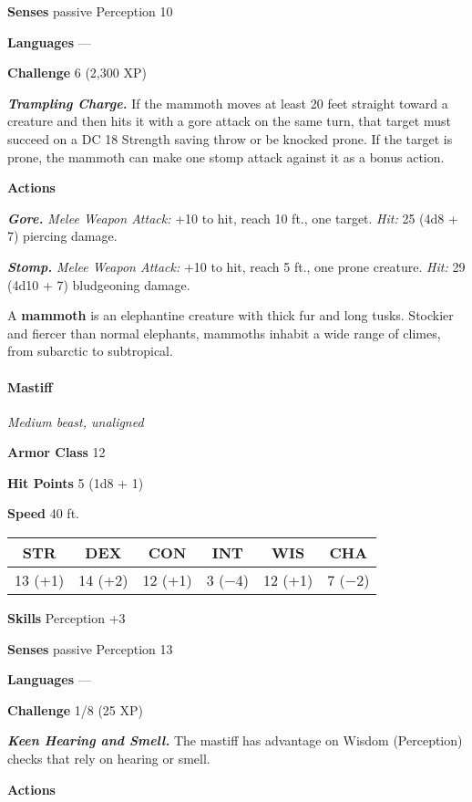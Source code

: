 \documentclass[
]{article}
\begin{document}
\textbf{Senses} passive Perception 10

\textbf{Languages} ---

\textbf{Challenge} 6 (2,300 XP)

\emph{\textbf{Trampling Charge.}} If the mammoth moves at least 20 feet
straight toward a creature and then hits it with a gore attack on the
same turn, that target must succeed on a DC 18 Strength saving throw or
be knocked prone. If the target is prone, the mammoth can make one stomp
attack against it as a bonus action.

\textbf{Actions}

\emph{\textbf{Gore.}} \emph{Melee Weapon Attack:} +10 to hit, reach 10
ft., one target. \emph{Hit:} 25 (4d8 + 7) piercing damage.

\emph{\textbf{Stomp.}} \emph{Melee Weapon Attack:} +10 to hit, reach 5
ft., one prone creature. \emph{Hit:} 29 (4d10 + 7) bludgeoning damage.

A \textbf{mammoth} is an elephantine creature with thick fur and long
tusks. Stockier and fiercer than normal elephants, mammoths inhabit a
wide range of climes, from subarctic to subtropical.

\hypertarget{mastiff}{%
\paragraph{Mastiff}\label{mastiff}}

\emph{Medium beast, unaligned}

\textbf{Armor Class} 12

\textbf{Hit Points} 5 (1d8 + 1)

\textbf{Speed} 40 ft.

\begin{longtable}[]{@{}cccccc@{}}
\toprule
STR & DEX & CON & INT & WIS & CHA\tabularnewline
\midrule
\endhead
13 (+1) & 14 (+2) & 12 (+1) & 3 (−4) & 12 (+1) & 7 (−2)\tabularnewline
\bottomrule
\end{longtable}

\textbf{Skills} Perception +3

\textbf{Senses} passive Perception 13

\textbf{Languages} ---

\textbf{Challenge} 1/8 (25 XP)

\emph{\textbf{Keen Hearing and Smell.}} The mastiff has advantage on
Wisdom (Perception) checks that rely on hearing or smell.

\textbf{Actions}
\end{document}
